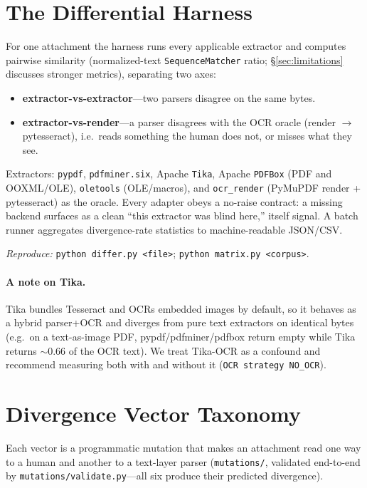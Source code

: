 \documentclass[11pt]{article}
\newcommand{\code}[1]{\texttt{#1}}
\begin{document}
\section{The Differential Harness}
\label{sec:harness}

For one attachment the harness runs every applicable extractor and computes
pairwise similarity (normalized-text \code{SequenceMatcher} ratio;
\S\ref{sec:limitations} discusses stronger metrics), separating two axes:
\begin{itemize}
  \item \textbf{extractor-vs-extractor}---two parsers disagree on the same bytes.
  \item \textbf{extractor-vs-render}---a parser disagrees with the OCR oracle
  (render $\rightarrow$ pytesseract), i.e.\ reads something the human does not,
  or misses what they see.
\end{itemize}

Extractors: \code{pypdf}, \code{pdfminer.six}, Apache \code{Tika}, Apache
\code{PDFBox} (PDF and OOXML/OLE), \code{oletools} (OLE/macros), and
\code{ocr\_render} (PyMuPDF render + pytesseract) as the oracle. Every adapter
obeys a no-raise contract: a missing backend surfaces as a clean ``this
extractor was blind here,'' itself signal. A batch runner aggregates
divergence-rate statistics to machine-readable JSON/CSV.

\emph{Reproduce:} \code{python differ.py <file>};
\code{python matrix.py <corpus>}.

\paragraph{A note on Tika.} Tika bundles Tesseract and OCRs embedded images by
default, so it behaves as a hybrid parser+OCR and diverges from pure text
extractors on identical bytes (e.g.\ on a text-as-image PDF,
pypdf/pdfminer/pdfbox return empty while Tika returns ${\sim}0.66$ of the OCR
text). We treat Tika-OCR as a confound and recommend measuring both with and
without it (\code{OCR strategy NO\_OCR}).

\section{Divergence Vector Taxonomy}
\label{sec:taxonomy}

Each vector is a programmatic mutation that makes an attachment read one way to a
human and another to a text-layer parser (\code{mutations/}, validated
end-to-end by \code{mutations/validate.py}---all six produce their predicted
divergence).
\end{document}
